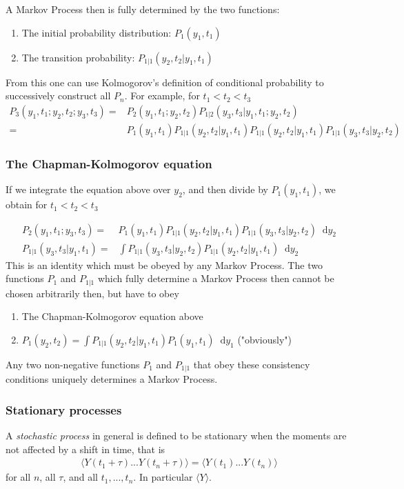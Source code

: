 \documentclass[twoside,english]{uiofysmaster}
\newcommand*\dif{\mathop{}\!\mathrm{d}}
\begin{document}
A Markov Process then is fully determined by the two functions:
\begin{enumerate}
	\item The initial probability distribution: $P_1 (y_1, t_1)$
	\item The transition probability: $P_{1|1} (y_2, t_2| y_1, t_1)$ 
\end{enumerate}
From this one can use Kolmogorov's definition of conditional probability to successively construct all $P_n$. For example, for 
$t_1 < t_2 < t_3$
\begin{align}
	P_3 (y_1, t_1; y_2, t_2; y_3, t_3) =& P_2 (y_1, t_1; y_2, t_2) P_{1|2} (y_3, t_3 | y_1, t_1; y_2, t_2) \\
	=& P_1 (y_1, t_1) P_{1|1} (y_2, t_2| y_1, t_1) P_{1|1} (y_2, t_2| y_1, t_1) P_{1|1} (y_3, t_3 | y_2, t_2)
\end{align}

\subsubsection{The Chapman-Kolmogorov equation}
If we integrate the equation above over $y_2$, and then divide by $P_1(y_1, t_1)$, we obtain for $t_1 < t_2 < t_3$ 

\begin{align}
	P_2 (y_1, t_1; y_3, t_3) =& P_1(y_1, t_1) P_{1|1} (y_2, t_2 | y_1, t_1) P_{1|1} (y_3, t_3| y_2, t_2) \dif y_2 \\
	P_{1|1} (y_3, t_3| y_1, t_1) =& \int P_{1|1} (y_3, t_3|y_2, t_2) P_{1|1} (y_2, t_2 | y_1, t_1) \dif y_2
\end{align}
This is an identity which must be obeyed by any Markov Process. The two functions $P_1$ and $P_{1|1}$ which fully determine a Markov Process then cannot be chosen arbitrarily then, but have to obey
\begin{enumerate}
	\item The Chapman-Kolmogorov equation above
	\item $P_1(y_2, t_2) = \int P_{1|1} (y_2, t_2| y_1, t_1) P_1 (y_1, t_1) \dif y_1$ ("obviously")
\end{enumerate}

Any two non-negative functions $P_1$ and $P_{1|1}$ that obey these consistency conditions uniquely determines a Markov Process.

\subsubsection{Stationary processes}
A \textit{stochastic process} in general is defined to be stationary when the moments are not affected by a shift in time, that is
\begin{align}
	\langle Y(t_1 + \tau)...Y(t_n + \tau) \rangle = \langle Y(t_1 )...Y(t_n ) \rangle
\end{align}
for all $n$, all $\tau$, and all $t_1, ..., t_n$. In particular $\langle Y \rangle$.
\end{document}

